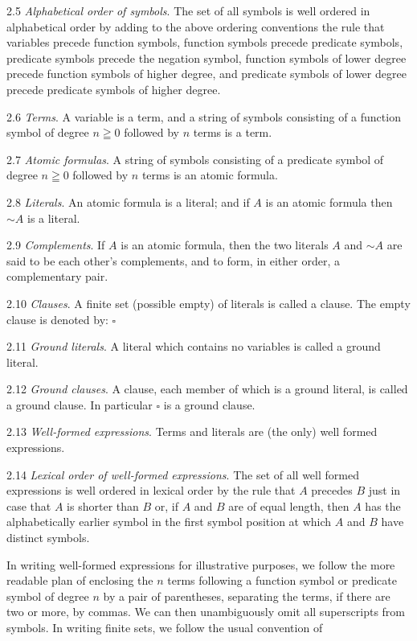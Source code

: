 \documentclass[8pt]{extarticle}
\begin{document}
2.5 \emph{Alphabetical order of symbols}. The set of all symbols is well ordered in alphabetical order by adding to the above ordering conventions the rule that variables precede function symbols, function symbols precede predicate symbols, predicate symbols precede the negation symbol, function symbols of lower degree precede function symbols of higher degree, and predicate symbols of lower degree precede predicate symbols of higher degree.

2.6 \emph{Terms}. A variable is a term, and a string of symbols consisting of a function symbol of degree $n\geqq0$ followed by $n$ terms is a term.

2.7 \emph{Atomic formulas}. A string of symbols consisting of a predicate symbol of degree $n\geqq0$ followed by $n$ terms is an atomic formula.

2.8 \emph{Literals}. An atomic formula is a literal; and if $A$ is an atomic formula then $\sim A$ is a literal.

2.9 \emph{Complements}. If $A$ is an atomic formula, then the two literals $A$ and $\sim A$ are said to be each other's complements, and to form, in either order, a complementary pair.

2.10 \emph{Clauses}. A finite set (possible empty) of literals is called a clause. The empty clause is denoted by: $\square$

2.11 \emph{Ground literals}. A literal which contains no variables is called a ground literal.

2.12 \emph{Ground clauses}. A clause, each member of which is a ground literal, is called a ground clause. In particular $\square$ is a ground clause.

2.13 \emph{Well-formed expressions}. Terms and literals are (the only) well formed expressions.

2.14 \emph{Lexical order of well-formed expressions}. The set of all well formed expressions is well ordered in lexical order by the rule that $A$ precedes $B$ just in case that $A$ is shorter than $B$ or, if $A$ and $B$ are of equal length, then $A$ has the alphabetically earlier symbol in the first symbol position at which $A$ and $B$ have distinct symbols.

In writing well-formed expressions for illustrative purposes, we follow the more readable plan of enclosing the $n$ terms following a function symbol or predicate symbol of degree $n$ by a pair of parentheses, separating the terms, if there are two or more, by commas. We can then unambiguously omit all superscripts from symbols. In writing finite sets, we follow the usual convention of
\end{document}
